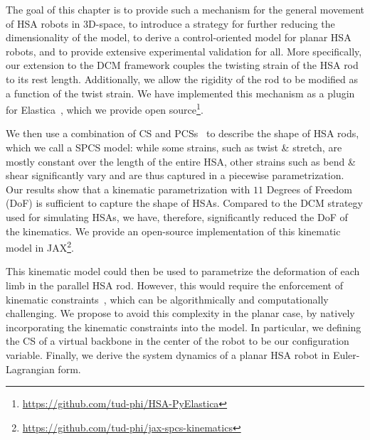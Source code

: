 The goal of this chapter is to provide such a mechanism for the general movement of \gls{HSA} robots in 3D-space, to introduce a strategy for further reducing the dimensionality of the model, to derive a control-oriented model for planar \gls{HSA} robots, and to provide extensive experimental validation for all. 
More specifically, our extension to the \gls{DCM} framework couples the twisting strain of the \gls{HSA} rod to its rest length. %
Additionally, we allow the rigidity of the rod to be modified as a function of the twist strain. %
We have implemented this mechanism as a plugin for Elastica~\cite{naughton2021elastica}, which we provide open source\footnote{\url{https://github.com/tud-phi/HSA-PyElastica}}. 

We then use a combination of \gls{CS} and \glspl{PCS}~\cite{renda2018discrete} to describe the shape of \gls{HSA} rods, which we call a \gls{SPCS} model: while some strains, such as twist \& stretch, are mostly constant over the length of the entire \gls{HSA}, other strains such as bend \& shear significantly vary and are thus captured in a piecewise parametrization. 
Our results show that a kinematic parametrization with $11$ Degrees of Freedom (DoF) is sufficient to capture the shape of \glspl{HSA}.
Compared to the \gls{DCM} strategy used for simulating \glspl{HSA}, we have, therefore, significantly reduced the DoF of the kinematics.
We provide an open-source implementation of this kinematic model in JAX\footnote{\scriptsize \url{https://github.com/tud-phi/jax-spcs-kinematics}}.

This kinematic model could then be used to parametrize the deformation of each limb in the parallel \gls{HSA} rod.
However, this would require the enforcement of kinematic constraints~\cite {armanini2021discrete}, which can be algorithmically and computationally challenging.
We propose to avoid this complexity in the planar case, by natively incorporating the kinematic constraints into the model. In particular, we 
defining the \gls{CS} of a virtual backbone in the center of the robot to be our configuration variable.
Finally, we derive the system dynamics of a planar \gls{HSA} robot in Euler-Lagrangian form.

